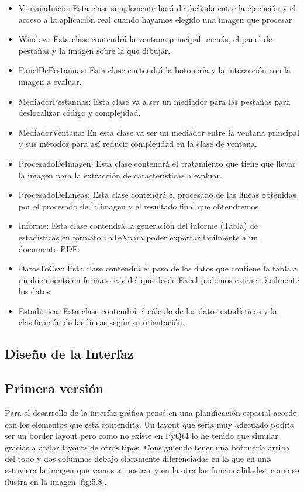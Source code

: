 \begin{itemize}
	\item VentanaInicio: 
Esta clase simplemente hará de fachada entre la ejecución y el acceso a la aplicación real cuando hayamos elegido una imagen que procesar
	\item Window:
Esta clase contendrá la ventana principal, menús, el panel de pestañas y la imagen sobre la que dibujar.
	\item PanelDePestannas:
Esta clase contendrá la botonería y la interacción con la imagen a evaluar.
	\item MediadorPestannas:
Esta clase va a ser un mediador para las pestañas para deslocalizar código y complejidad.
	\item MediadorVentana:
En esta clase va ser un mediador entre la ventana principal y sus métodos para así reducir complejidad en la clase de ventana.
	\item ProcesadoDeImagen:
Esta clase contendrá el tratamiento que tiene que llevar la imagen para la extracción de características a evaluar.
	\item ProcesadoDeLineas:
Esta clase contendrá el procesado de las líneas obtenidas por el procesado de la imagen y el resultado final que obtendremos.
	\item Informe: 
Esta clase contendrá la generación del informe (Tabla) de estadísticas en formato \LaTeX para poder exportar fácilmente a un documento PDF.
	\item DatosToCsv:
Esta clase contendrá el paso de los datos que contiene la tabla a un documento en formato csv del que desde Excel podemos extraer fácilmente los datos.
	\item Estadistica: 
Esta clase contendrá el cálculo de los datos estadísticos y la clasificación de las líneas según su orientación.
\end{itemize}





\subsection{Diseño de la Interfaz}

\subsection{Primera versión}

Para el desarrollo de la interfaz gráfica pensé en una planificación espacial acorde con los elementos que esta contendría.
Un layout que seria muy adecuado podría ser un border layout pero como no existe en PyQt4 lo he tenido que simular gracias a apilar layouts de otros tipos.
Consiguiendo tener una botonería arriba del todo y dos columnas debajo claramente diferenciadas en la que en una estuviera la imagen que vamos a mostrar y en la otra las funcionalidades, como se ilustra en la imagen \ref{fig:5.8}.


